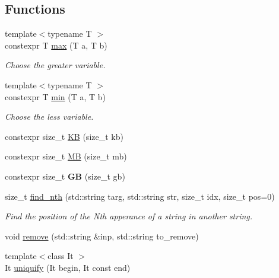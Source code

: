 \subsection*{Functions}
\begin{DoxyCompactItemize}
\item 
{\footnotesize template$<$typename T $>$ }\\constexpr T \mbox{\hyperlink{namespaceeka2l1_1_1common_a43af9f272265cfb2ecad3ec902d1ab4e}{max}} (T a, T b)
\begin{DoxyCompactList}\small\item\em Choose the greater variable. \end{DoxyCompactList}\item 
{\footnotesize template$<$typename T $>$ }\\constexpr T \mbox{\hyperlink{namespaceeka2l1_1_1common_a8da53deb444a8bd214227b4098564855}{min}} (T a, T b)
\begin{DoxyCompactList}\small\item\em Choose the less variable. \end{DoxyCompactList}\item 
constexpr size\+\_\+t \mbox{\hyperlink{namespaceeka2l1_1_1common_a1985e07bb15ce95c29ed2d4bc67361d8}{KB}} (size\+\_\+t kb)
\item 
constexpr size\+\_\+t \mbox{\hyperlink{namespaceeka2l1_1_1common_aeb726f22c3441e71f033bdc4114807f9}{MB}} (size\+\_\+t mb)
\item 
\mbox{\label{namespaceeka2l1_1_1common_a22ec07e549b56c287ee9b7a357754f33}} 
constexpr size\+\_\+t {\bfseries GB} (size\+\_\+t gb)
\item 
size\+\_\+t \mbox{\hyperlink{namespaceeka2l1_1_1common_a925009c74de9e04482d9dc2caca9f667}{find\+\_\+nth}} (std\+::string targ, std\+::string str, size\+\_\+t idx, size\+\_\+t pos=0)
\begin{DoxyCompactList}\small\item\em Find the position of the Nth apperance of a string in another string. \end{DoxyCompactList}\item 
void \mbox{\hyperlink{namespaceeka2l1_1_1common_aa8ab48a3136a4a67a6b3eb78b25d4996}{remove}} (std\+::string \&inp, std\+::string to\+\_\+remove)
\item 
{\footnotesize template$<$class It $>$ }\\It \mbox{\hyperlink{namespaceeka2l1_1_1common_afbac38cd50b976880960c14f00cc61af}{uniquify}} (It begin, It const end)

\end{DoxyCompactItemize}

